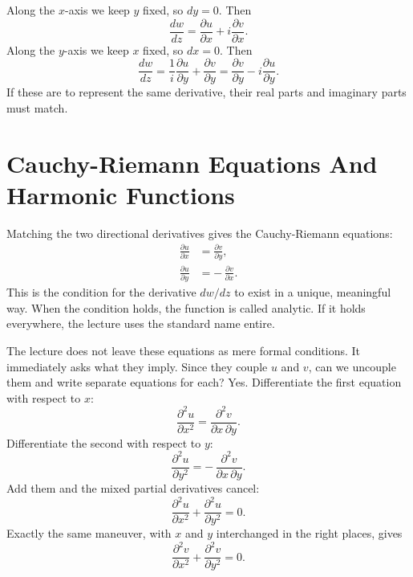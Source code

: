 Along the \(x\)-axis we keep \(y\) fixed, so \(dy=0\). Then
\begin{equation}
\frac{dw}{dz}
=
\frac{\partial u}{\partial x}
+
i\frac{\partial v}{\partial x}.
\end{equation}
Along the \(y\)-axis we keep \(x\) fixed, so \(dx=0\). Then
\begin{equation}
\frac{dw}{dz}
=
\frac{1}{i}\frac{\partial u}{\partial y}
+
\frac{\partial v}{\partial y}
=
\frac{\partial v}{\partial y}
-
i\frac{\partial u}{\partial y}.
\end{equation}
If these are to represent the same derivative, their real parts and imaginary parts must match.

\section{Cauchy-Riemann Equations And Harmonic Functions}

Matching the two directional derivatives gives the Cauchy-Riemann equations:
\begin{align}
\frac{\partial u}{\partial x} &= \frac{\partial v}{\partial y}, \\
\frac{\partial u}{\partial y} &= -\,\frac{\partial v}{\partial x}.
\end{align}
This is the condition for the derivative \(dw/dz\) to exist in a unique, meaningful way. When the condition holds, the function is called analytic. If it holds everywhere, the lecture uses the standard name entire.

The lecture does not leave these equations as mere formal conditions. It immediately asks what they imply. Since they couple \(u\) and \(v\), can we uncouple them and write separate equations for each? Yes. Differentiate the first equation with respect to \(x\):
\begin{equation}
\frac{\partial^2 u}{\partial x^2}
=
\frac{\partial^2 v}{\partial x\,\partial y}.
\end{equation}
Differentiate the second with respect to \(y\):
\begin{equation}
\frac{\partial^2 u}{\partial y^2}
=
-\,\frac{\partial^2 v}{\partial x\,\partial y}.
\end{equation}
Add them and the mixed partial derivatives cancel:
\begin{equation}
\frac{\partial^2 u}{\partial x^2}
+
\frac{\partial^2 u}{\partial y^2}
=0.
\end{equation}
Exactly the same maneuver, with \(x\) and \(y\) interchanged in the right places, gives
\begin{equation}
\frac{\partial^2 v}{\partial x^2}
+
\frac{\partial^2 v}{\partial y^2}
=0.
\end{equation}

